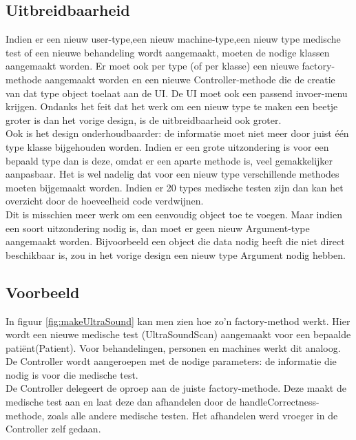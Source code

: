 \subsection{Uitbreidbaarheid}
Indien er een nieuw user-type,een nieuw machine-type,een nieuw type medische test of een nieuwe behandeling wordt aangemaakt, moeten de nodige klassen aangemaakt worden. 
Er moet ook per type (of per klasse) een nieuwe factory-methode aangemaakt worden en een nieuwe Controller-methode die de creatie van dat type object toelaat aan de UI.
De UI moet ook een passend invoer-menu krijgen. 
Ondanks het feit dat het werk om een nieuw type te maken een beetje groter is dan het vorige design, is de uitbreidbaarheid ook groter. \\

Ook is het design onderhoudbaarder: de informatie moet niet meer door juist één type klasse bijgehouden worden. 
Indien er een grote uitzondering is voor een bepaald type dan is deze, omdat er een aparte methode is, veel gemakkelijker aanpasbaar.
Het is wel nadelig dat voor een nieuw type verschillende methodes moeten bijgemaakt worden. 
Indien er 20 types medische testen zijn dan kan het overzicht door de hoeveelheid code verdwijnen.\\

Dit is misschien meer werk om een eenvoudig object toe te voegen.
Maar indien een soort uitzondering nodig is, dan moet er geen nieuw Argument-type aangemaakt worden. 
Bijvoorbeeld een object die data nodig heeft die niet direct beschikbaar is, zou in het vorige design een nieuw type Argument nodig hebben. 

\subsection{Voorbeeld\label{sec:factVB}}
In figuur \ref{fig:makeUltraSound} kan men zien hoe zo'n factory-method werkt. 
Hier wordt een nieuwe medische test (UltraSoundScan) aangemaakt voor een bepaalde patiënt(Patient).
Voor behandelingen, personen en machines werkt dit analoog. 
De Controller wordt aangeroepen met de nodige parameters: de informatie die nodig is voor die medische test. \\

De Controller delegeert de oproep aan de juiste factory-methode. 
Deze maakt de medische test aan en laat deze dan afhandelen door de handleCorrectness-methode, zoals alle andere medische testen. 
Het afhandelen werd vroeger in de Controller zelf gedaan. \\

